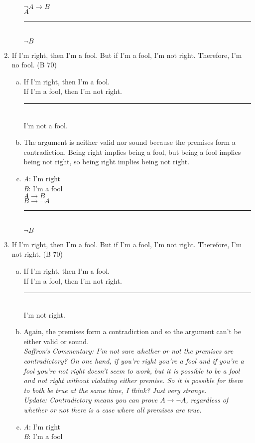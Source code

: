 \documentclass{article}
\begin{document}
\begin{enumerate}
\begin{enumerate}[(a)]
                    $\neg A \to B$\\
                    $A$\\
                    \rule{5em}{.5pt}\\
                    $\neg B$
          \end{enumerate}
    \item If I'm right, then I'm a fool. But if I'm a fool, I'm not right. Therefore, I'm no fool. (B 70)
          \begin{enumerate}[(a)]
              \item If I'm right, then I'm a fool.\\
                    If I'm a fool, then I'm not right.\\
                    \rule{15em}{.5pt}\\
                    I'm not a fool.
              \item The argument is neither valid nor sound because the premises form a contradiction. Being right implies being a fool, but being a fool implies being not right, so being right implies being not right.
              \item \textit{A}: I'm right\\
                    \textit{B}: I'm a fool\\

                    $A \to B$\\
                    $B \to \neg A$\\
                    \rule{5em}{.5pt}\\
                    $\neg B$
          \end{enumerate}
    \item If I'm right, then I'm a fool. But if I'm a fool, I'm not right. Therefore, I'm not right. (B 70)
          \begin{enumerate}[(a)]
              \item If I'm right, then I'm a fool.\\
                    If I'm a fool, then I'm not right.\\
                    \rule{15em}{.5pt}\\
                    I'm not right.
              \item Again, the premises form a contradiction and so the argument can't be either valid or sound.\\  
              \textit{Saffron's Commentary: I'm not sure whether or not the premises are contradictory? On one hand, if you're right you're a fool and if you're a fool you're not right doesn't seem to work, but it is possible to be a fool and not right without violating either premise. So it is possible for them to both be true at the same time, I think? Just very strange.\\
              Update: Contradictory means you can prove $A \to \neg A$, regardless of whether or not there is a case where all premises are true.}
              \item \textit{A}: I'm right\\
                    \textit{B}: I'm a fool\\


\end{enumerate}
\end{enumerate}
\end{document}
